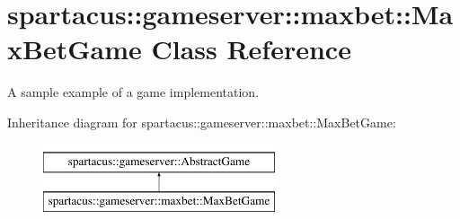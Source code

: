 \hypertarget{classspartacus_1_1gameserver_1_1maxbet_1_1MaxBetGame}{
\section{\-s\-p\-a\-r\-t\-a\-c\-u\-s\-:\-:\-g\-a\-m\-e\-s\-e\-r\-v\-e\-r\-:\-:\-m\-a\-x\-b\-e\-t\-:\-:\-M\-a\-x\-B\-e\-t\-G\-a\-m\-e \-C\-l\-a\-s\-s \-R\-e\-f\-e\-r\-e\-n\-c\-e}
\label{classspartacus_1_1gameserver_1_1maxbet_1_1MaxBetGame}
}


A sample example of a game implementation.  


Inheritance diagram for spartacus::gameserver::maxbet::\-M\-a\-x\-B\-e\-t\-G\-a\-m\-e:\begin{figure}[H]
\begin{center}
\leavevmode
\includegraphics[height=2.000000cm]{classspartacus_1_1gameserver_1_1maxbet_1_1MaxBetGame}
\end{center}
\end{figure}
